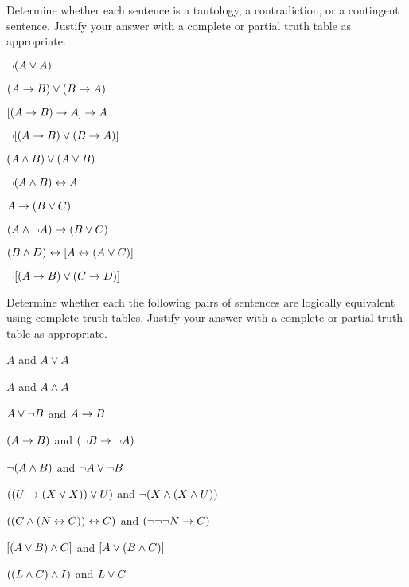 \noindent\problempart
\label{pr.TT.TTorC4}
Determine whether each sentence is a tautology, a contradiction, or a contingent sentence. Justify your answer with a complete or partial truth table as appropriate.
\begin{compactlist}
\item  $\neg (A \vee A)$\vspace{.5ex}							%
\item $(A \rightarrow B) \vee (B \rightarrow A)$\vspace{.5ex}					%
\item $[(A \rightarrow B) \rightarrow A] \rightarrow A$\vspace{.5ex}					%
\item $\neg[( A \rightarrow B) \vee (B \rightarrow A)]$\vspace{.5ex}			%
\item $(A \wedge B) \vee (A \vee B)$\vspace{.5ex} 				%
\item $\neg(A\wedge B) \leftrightarrow A$\vspace{.5ex} 					%
\item $A\rightarrow(B\vee C)$\vspace{.5ex} 							%
\item $(A \wedge\neg A) \rightarrow (B \vee C)$\vspace{.5ex} 			%
\item $(B\wedge D) \leftrightarrow [A \leftrightarrow(A \vee C)]$\vspace{.5ex}			%
\item $\neg[(A \rightarrow B) \vee (C \rightarrow D)]$\vspace{.5ex} 			%
\end{compactlist}



\noindent\problempart
Determine whether each the following pairs of sentences are logically equivalent using complete truth tables. Justify your answer with a complete or partial truth table as appropriate.
\begin{compactlist}
\item $A$ and $A \vee A$
\item $A$ and $A \wedge A$
\item $A \vee \neg B$ and $A\rightarrow B$
\item $(A \rightarrow B)$ and $(\neg B \rightarrow \neg A)$
\item $\neg(A \wedge B)$ and $\neg A \vee \neg B$
\item $ ((U \rightarrow (X \vee X)) \vee U)$ and $\neg (X \wedge (X \wedge U))$
\item $ ((C \wedge (N \leftrightarrow C)) \leftrightarrow C)$ and $(\neg \neg \neg N \rightarrow C)$
\item $[(A \vee B) \wedge C]$ and $[A \vee (B \wedge C)]$
\item $((L \wedge C) \wedge I)$ and $L \vee C$
\end{compactlist}


